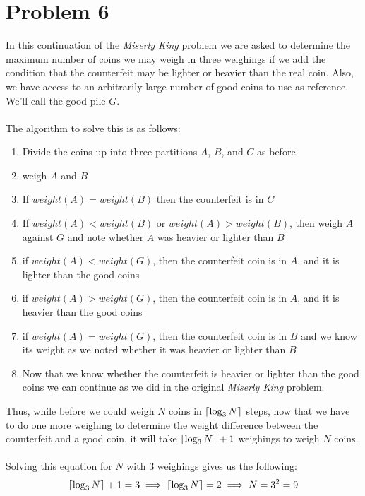 \section*{Problem 6}

In this continuation of the \textit{Miserly King} problem we are asked 
to 
determine the maximum number of coins we may weigh in three weighings 
if we add the condition that the counterfeit may be lighter or heavier
than the real coin. Also, we have access to an arbitrarily large number
of good coins to use as reference. We'll call the good pile $G$.
\\
\\
The algorithm to solve this is as follows:

\begin{enumerate}[noitemsep]
    \item Divide the coins up into three partitions $A$, $B$, and $C$ 
          as before
    \item weigh $A$ and $B$
    \item If $weight(A) = weight(B)$ then the counterfeit is in $C$
    \item If $weight(A) < weight(B)$ or $weight(A) > weight(B)$, 
             then weigh $A$ against $G$ and note whether $A$ was 
             heavier or lighter than $B$
    \item if $weight(A) < weight(G)$, then the counterfeit coin
                is in $A$, and it is lighter than the good coins
    \item if $weight(A) >  weight(G)$, then the counterfeit coin
                is in $A$, and it is heavier than the good coins
    \item if $weight(A) = weight(G)$, then the counterfeit coin is                in $B$ and we know its weight as we noted whether it 
                was heavier or lighter than $B$
    \item Now that we know whether the counterfeit is heavier or 
          lighter than the good coins we can continue as we did in the 
          original \textit{Miserly King} problem.
\end{enumerate}
%
Thus, while before we could weigh $N$ coins in $\lceil\log_3 N\rceil$ steps,
now that we have to do one more weighing to determine the weight 
difference between the counterfeit and a good coin, it will take  
$\lceil\log_3 N\rceil + 1$ weighings to weigh $N$ coins.
\\
\\
Solving this equation for $N$ with 3 weighings gives us the following:
$$
\lceil\log_3 N\rceil + 1 = 3 \implies 
\lceil\log_3 N\rceil = 2 \implies 
N = 3^2 = 9
$$
